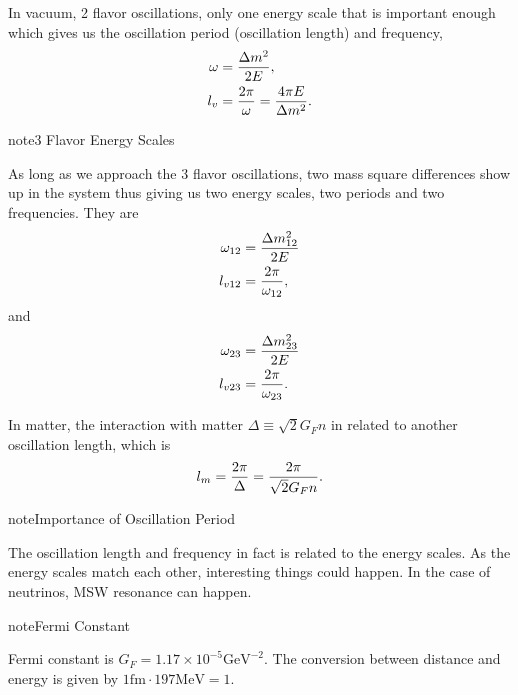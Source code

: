 \documentclass[letterpaper,12pt,english]{sphinxmanual}
\begin{document}
In vacuum, 2 flavor oscillations, only one energy scale that is important enough which gives us the oscillation period (oscillation length) and frequency,
\begin{gather}
\begin{split}\omega &= \frac{\Delta m^2}{2E},\\
l_v &= \frac{2\pi}{\omega} = \frac{4\pi E}{\Delta m^2}.\end{split}\notag
\end{gather}
\begin{notice}{note}{3 Flavor Energy Scales}

As long as we approach the 3 flavor oscillations, two mass square differences show up in the system thus giving us two energy scales, two periods and two frequencies. They are
\begin{gather}
\begin{split}\omega_{12} &= \frac{\Delta m_{12}^2}{2E} \\       l_{v12} & = \frac{2\pi}{\omega_{12}},\end{split}\notag
\end{gather}
and
\begin{gather}
\begin{split}\omega_{23} &= \frac{\Delta m_{23}^2}{2E} \\
l_{v23} & = \frac{2\pi}{\omega_{23}}.\end{split}\notag
\end{gather}\end{notice}

In matter, the interaction with matter \(\Delta \equiv \sqrt{2} G_F n\) in related to another oscillation length, which is
\begin{gather}
\begin{split}l_m = \frac{2\pi}{\Delta} = \frac{2\pi}{\sqrt{2}G_F n} .\end{split}\notag
\end{gather}
\begin{notice}{note}{Importance of Oscillation Period}

The oscillation length and frequency in fact is related to the energy scales. As the energy scales match each other, interesting things could happen. In the case of neutrinos, MSW resonance can happen.
\end{notice}

\begin{notice}{note}{Fermi Constant}

Fermi constant is \(G_F=1.17\times 10^{-5}\mathrm{GeV^{-2}}\). The conversion between distance and energy is given by \(1\mathrm{fm}\cdot 197\mathrm{MeV}=1\).
\end{notice}
\end{document}
